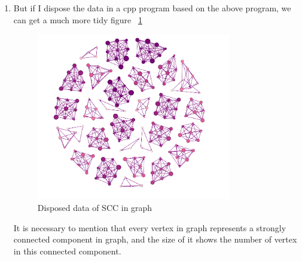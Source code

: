 \documentclass[12pt,a4paper]{article}
\makeatletter
\newtheorem*{solution}{Solution}
\theoremstyle{definition}
\renewenvironment{solution}[1][Solution] {\par\pushQED{\qed}\normalfont\topsep6\p@\@plus6\p@\relax\trivlist\item[\hskip\labelsep\bfseries#1\@addpunct{.}]\ignorespaces}{\popQED\endtrivlist\@endpefalse} \makeatother
\makeatother
\begin{document}
\begin{enumerate}
\begin{solution}
\begin{enumerate}
\begin{figure}[htbp]
        \end{figure} 
        But if I dispose the data in a cpp program based on the above program, we can get a much more tidy figure ~\ref{result2}
        \begin{figure}[htbp]
        \centering
        \includegraphics[width=0.8\textwidth]{modify.png}
        \caption{Disposed data of SCC in graph}\label{result2}
        \end{figure} 
        \par It is necessary to mention that every vertex in graph represents a strongly connected component in graph, and the size of it shows the number of vertex in this connected component.
    \end{enumerate}
    \end{solution}
\end{enumerate} 
\end{document}
